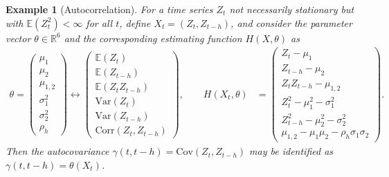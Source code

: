 \documentclass[10pt, a4paper]{article}
\theoremstyle{assumption}
\newtheorem{example}{Example}[section]
\theoremstyle{definition}
\theoremstyle{theorem}
\newcommand{\R}{\mathbb{R}}
\newcommand{\E}{\mathbb{E}}
\newcommand{\Cov}{\mathrm{Cov}}
\begin{document}
\begin{example}[Autocorrelation]\label{ex:acf}
    For a time series $Z_t$ not necessarily stationary but with $\E(Z_t^2) < \infty$ for all $t$, define $X_t=(Z_t,Z_{t-h})$, and consider the parameter vector $\theta \in \R^6$ and the corresponding estimating function $H(X,\theta)$ as 
    \begin{align*}
        \theta = \begin{pmatrix}
            \mu_1 \\
            \mu_2 \\
            \mu_{1,2}\\
            \sigma_1^2 \\
            \sigma_2^2 \\
            \rho_h   
        \end{pmatrix} \leftrightarrow 
        \begin{pmatrix}
            \E(Z_t) \\
            \E(Z_{t-h}) \\
            \E(Z_t Z_{t-h})\\
            \mathrm{Var}(Z_t) \\
            \mathrm{Var}(Z_{t-h}) \\
            \mathrm{Corr}(Z_t, Z_{t-h})
        \end{pmatrix},
        \qquad H(X_t,\theta) &= \begin{pmatrix}
            Z_t - \mu_1 \\
            Z_{t-h} - \mu_2 \\
            Z_t Z_{t-h} - \mu_{1,2} \\
            Z_t^2 - \mu_1^2 - \sigma_1^2 \\
            Z_{t-h}^2 - \mu_2^2 - \sigma_2^2 \\
            \mu_{1,2} - \mu_1\mu_2 - \rho_h\sigma_1\sigma_2
        \end{pmatrix}.
    \end{align*}
    Then the autocovariance $\gamma(t,t-h)=\Cov(Z_t,Z_{t-h})$ may be identified as $\gamma(t,t-h)=\theta(X_t)$.
\end{example}
\end{document}
